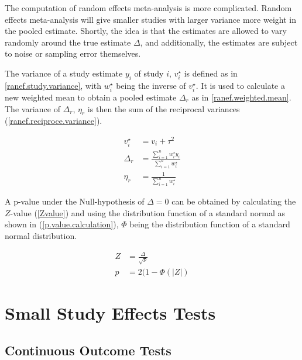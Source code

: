 \documentclass[11pt,a4paper,twoside]{book}\usepackage[]{graphicx}\usepackage[]{color}
\begin{document}
The computation of random effects meta-analysis is more complicated. Random effects meta-analysis will give smaller studies with larger variance more weight in the pooled estimate. Shortly, the idea is that the estimates are allowed to vary randomly around the true estimate $\Delta$, and additionally, the estimates are subject to noise or sampling error themselves. 

\vspace{0mm}
The variance of a study estimate $y_{i}$ of study $i$, $v_{i}^\star$ is defined as in \ref{ranef.study.variance}, with $w_{i}^\star$ being the inverse of $v_{i}^\star$. It is used to calculate a new weighted mean to obtain a pooled estimate $\Delta_{r}$ as in \ref{ranef.weighted.mean}. The variance of $\Delta_{r}$, $\eta_{r}$ is then the sum of the reciprocal variances (\ref{ranef.reciproce.variance}).

\begin{align}
v_{i}^\star &= v_{i} + \tau^2 \label{ranef.study.variance} \\
\Delta_{r} &= \frac{\sum_{i = 1}^n w_{i}^\star y_{i}}{\sum_{i = 1}^n w_{i}^\star} \label{ranef.weighted.mean} \\
\eta_{r} &= \frac{1}{\sum_{i = 1}^n w_{i}^\star} \label{ranef.reciproce.variance}
\end{align}

A p-value under the Null-hypothesis of $\Delta = 0$ can be obtained by calculating the $Z$-value (\ref{Zvalue}) and using the distribution function of a standard normal as shown in (\ref{p.value.calculation}), $\Phi$ being the distribution function of a standard normal distribution. 

\begin{align}
Z &= \frac{\Delta}{\sqrt{\nu}} \label{Zvalue} \\
p &= 2(1 - \Phi(|{Z}|) \label{p.value.calculation}
\end{align}

\section{Small Study Effects Tests}
\subsection{Continuous Outcome Tests}
\end{document}
